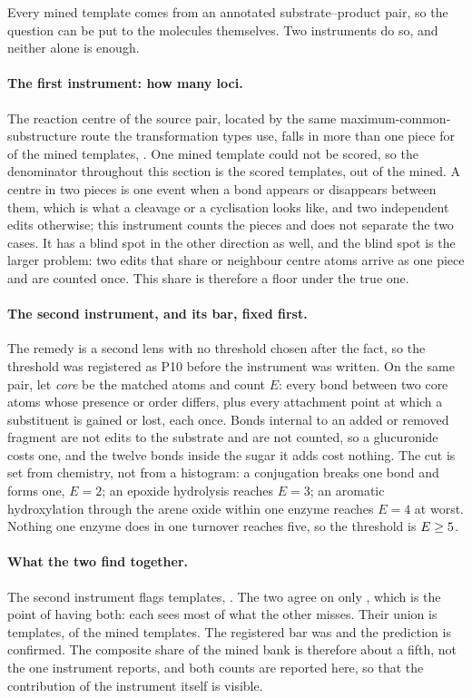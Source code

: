 \documentclass[journal=jcisd8,manuscript=suppinfo,layout=onecolumn]{achemso}
\begin{document}
Every mined template comes from an annotated substrate--product pair, so the question can be put
to the molecules themselves. Two instruments do so, and neither alone is enough.

\paragraph{The first instrument: how many loci.} The reaction centre of the source pair, located
by the same maximum-common-substructure route the transformation types use, falls in more than one
piece for \numCompositeLoci{} of the \numCompositeScored{} mined templates,
\numCompositeLocisharePct{}. One mined template could not be scored, so the denominator throughout
this section is the \numCompositeScored{} scored templates, out of the \numMinedRules{} mined. A
centre in two pieces is one event when a bond appears or disappears between them, which is what a
cleavage or a cyclisation looks like, and two independent edits
otherwise; this instrument counts the pieces and does not separate the two cases. It has a blind
spot in the other direction as well, and the blind spot is the larger problem: two edits that
share or neighbour centre atoms arrive as one piece and are counted once. This share is therefore
a floor under the true one.

\paragraph{The second instrument, and its bar, fixed first.} The remedy is a second lens with no
threshold chosen after the fact, so the threshold was registered as P10 before the instrument was
written. On the same pair, let \emph{core} be the matched atoms and count $E$: every bond between
two core atoms whose presence or order differs, plus every attachment point at which a substituent
is gained or lost, each once. Bonds internal to an added or removed fragment are not edits to the
substrate and are not counted, so a glucuronide costs one, and the twelve bonds inside the sugar
it adds cost nothing. The cut is set from
chemistry, not from a histogram: a conjugation breaks one bond and forms one, $E=2$; an
epoxide hydrolysis reaches $E=3$; an aromatic hydroxylation through the arene oxide within one
enzyme reaches $E=4$ at worst. Nothing one enzyme does in one turnover reaches five, so the
threshold is $E \ge 5{}$.

\paragraph{What the two find together.} The second instrument flags \numCompositeEdits{}
templates, \numCompositeEditsharePct{}. The two agree on only \numCompositeBoth{}, which is the
point of having both: each sees most of what the other misses. Their union is
\numCompositeUnion{} templates, \numCompositeUnionsharePct{} of the mined templates. The registered
bar
was \numCompositeBarPct{} and the prediction is confirmed. The composite share of the mined bank is
therefore about a fifth, not the \numCompositeLocisharePct{} one instrument reports, and both counts
are reported here, so that the contribution of the instrument itself is visible.
\end{document}

